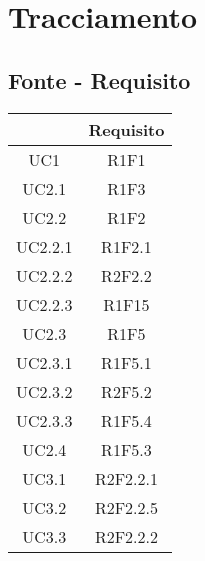 \section{Tracciamento} \label{section: tracciamento}

\subsection{Fonte - Requisito}\label{subsection: fonti}

\begin{table}[H]
	\centering
	\renewcommand{\arraystretch}{1.8}
	\begin{tabular}{c | c}
		\rowcolor[HTML]{125E28}
		\multicolumn{1}{c}{\color[HTML]{FFFFFF} \textbf{Fonte}} &
		\multicolumn{1}{c}{\color[HTML]{FFFFFF} \textbf{Requisito}}              \\
		\hline
		UC1                                                     & R1F1           \\ \hline
		UC2.1                                                   & R1F3           \\ \hline
		UC2.2                                                   & R1F2           \\ \hline
		UC2.2.1                                                 & R1F2.1         \\ \hline
		UC2.2.2                                                 & R2F2.2         \\ \hline
		UC2.2.3                                                 & R1F15          \\ \hline
		UC2.3                                                   & R1F5           \\ \hline
		UC2.3.1                                                 & R1F5.1         \\ \hline
		UC2.3.2                                                 & R2F5.2         \\ \hline
		UC2.3.3                                                 & R1F5.4         \\ \hline
		UC2.4                                                   & R1F5.3         \\ \hline
		UC3.1                                                   & R2F2.2.1       \\ \hline
		UC3.2                                                   & R2F2.2.5       \\ \hline
		UC3.3                                                   & R2F2.2.2       \\ \hline

\end{tabular}
\end{table}
